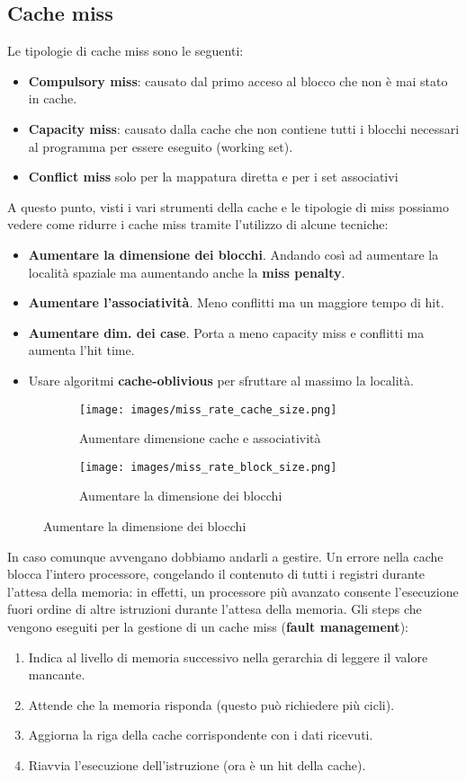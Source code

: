 \subsection{Cache miss}
Le tipologie di cache miss sono le seguenti:
\begin{itemize}
	\item \textbf{Compulsory miss}: causato dal primo acceso al blocco che non è mai stato in cache.
	\item \textbf{Capacity miss}: causato dalla cache che non contiene tutti i blocchi necessari al programma per essere eseguito (working set).
	\item \textbf{Conflict miss} solo per la mappatura diretta e per i set associativi
\end{itemize}
A questo punto, visti i vari strumenti della cache e le tipologie di miss possiamo vedere come ridurre i cache miss tramite l'utilizzo di alcune tecniche:
\begin{itemize}
	\item \textbf{Aumentare la dimensione dei blocchi}. Andando così ad aumentare la località spaziale ma aumentando anche la \textbf{miss penalty}.
	\item \textbf{Aumentare l'associatività}. Meno conflitti ma un maggiore tempo di hit.
	\item \textbf{Aumentare dim. dei case}. Porta a meno capacity miss e conflitti ma aumenta l'hit time.
	\item Usare algoritmi \textbf{cache-oblivious} per sfruttare al massimo la località.
\end{itemize}
\begin{figure}[h]
	\centering
	\begin{subfigure}{.45\textwidth}
		\centering
		\texttt{[image: images/miss\_rate\_cache\_size.png]}
		\caption{Aumentare dimensione cache e associatività}
	\end{subfigure}
	\begin{subfigure}{.45\textwidth}
		\centering
		\texttt{[image: images/miss\_rate\_block\_size.png]}
		\caption{Aumentare la dimensione dei blocchi}
	\end{subfigure}
\end{figure}

In caso comunque avvengano dobbiamo andarli a gestire. Un errore nella cache blocca l'intero processore, congelando il contenuto di tutti i registri durante l'attesa della memoria: in effetti, un processore più avanzato consente l'esecuzione fuori ordine di altre istruzioni durante l'attesa della memoria.
Gli steps che vengono eseguiti per la gestione di un cache miss (\textbf{fault management}):
\begin{enumerate}
	\item Indica al livello di memoria successivo nella gerarchia di leggere il valore mancante.
	\item Attende che la memoria risponda (questo può richiedere più cicli).
	\item Aggiorna la riga della cache corrispondente con i dati ricevuti.
	\item Riavvia l'esecuzione dell'istruzione (ora è un hit della cache).
\end{enumerate}

